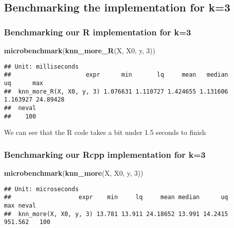 \documentclass[]{article}
\newenvironment{Shaded}{\begin{snugshade}}{\end{snugshade}}
\newcommand{\DecValTok}[1]{\textcolor[rgb]{0.00,0.00,0.81}{#1}}
\newcommand{\KeywordTok}[1]{\textcolor[rgb]{0.13,0.29,0.53}{\textbf{#1}}}
\newcommand{\NormalTok}[1]{#1}
\begin{document}
\hypertarget{benchmarking-the-implementation-for-k3}{%
\subsection{Benchmarking the implementation for
k=3}\label{benchmarking-the-implementation-for-k3}}

\hypertarget{benchmarking-our-r-implementation-for-k3}{%
\subsubsection{Benchmarking our R implementation for
k=3}\label{benchmarking-our-r-implementation-for-k3}}

\begin{Shaded}
\begin{Highlighting}[]
\KeywordTok{microbenchmark}\NormalTok{(}\KeywordTok{knn_more_R}\NormalTok{(X, X0, y, }\DecValTok{3}\NormalTok{))}
\end{Highlighting}
\end{Shaded}

\begin{verbatim}
## Unit: milliseconds
##                     expr      min       lq     mean   median       uq      max
##  knn_more_R(X, X0, y, 3) 1.076631 1.110727 1.424655 1.131606 1.163927 24.89428
##  neval
##    100
\end{verbatim}

We can see that the R code takes a bit under 1.5 seconds to finish

\hypertarget{benchmarking-our-rcpp-implementation-for-k3}{%
\subsubsection{Benchmarking our Rcpp implementation for
k=3}\label{benchmarking-our-rcpp-implementation-for-k3}}

\begin{Shaded}
\begin{Highlighting}[]
\KeywordTok{microbenchmark}\NormalTok{(}\KeywordTok{knn_more}\NormalTok{(X, X0, y, }\DecValTok{3}\NormalTok{))}
\end{Highlighting}
\end{Shaded}

\begin{verbatim}
## Unit: microseconds
##                   expr    min     lq     mean median      uq     max neval
##  knn_more(X, X0, y, 3) 13.781 13.911 24.18652 13.991 14.2415 951.562   100
\end{verbatim}
\end{document}
